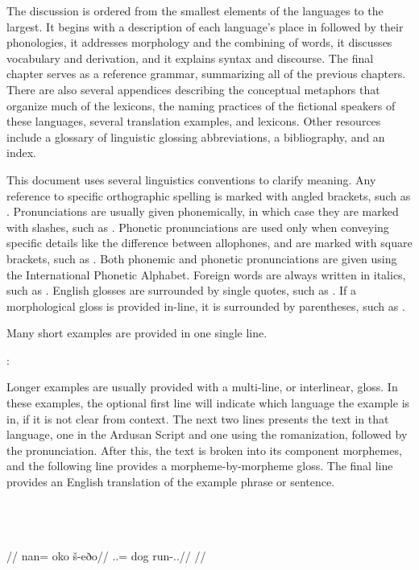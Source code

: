 The discussion is ordered from the smallest elements of the languages to the largest. It begins with a description of each language's place in \landn{} followed by their phonologies, it addresses morphology and the combining of words, it discusses vocabulary and derivation, and it explains syntax and discourse. The final chapter serves as a reference grammar, summarizing all of the previous chapters. There are also several appendices describing the conceptual metaphors that organize much of the lexicons, the naming practices of the fictional speakers of these languages, several translation examples, and lexicons. Other resources include a glossary of linguistic glossing abbreviations, a bibliography, and an index.

This document uses several linguistics conventions to clarify meaning. Any reference to specific orthographic spelling is marked with angled brackets, such as . Pronunciations are usually given phonemically, in which case they are marked with slashes, such as . Phonetic pronunciations are used only when conveying specific details like the difference between allophones, and are marked with square brackets, such as . Both phonemic and phonetic pronunciations are given using the International Phonetic Alphabet. Foreign words are always written in italics, such as . English glosses are surrounded by single quotes, such as . If a morphological gloss is provided in-line, it is surrounded by parentheses, such as \gloss{\Inf}.

Many short examples are provided in one single line.

	\langtvk:     
\xe

Longer examples are usually provided with a multi-line, or interlinear, gloss. In these examples, the optional first line will indicate which language the example is in, if it is not clear from context. The next two lines presents the text in that language, one in the Ardusan Script and one using the romanization, followed by the pronunciation. After this, the text is broken into its component morphemes, and the following line provides a morpheme-by-morpheme gloss. The final line provides an English translation of the example phrase or sentence.

	\begingl
		\glpreamble \langtvk\\
		\\
		\\
		//
		\gla nan= oko š-eðo//
		\glb \Pl.\An.\Top= dog run-\Ind.\Pst.\Prg//
		\glft {}//
	\endgl
\xe

